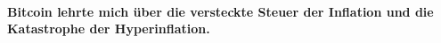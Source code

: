 \paragraph{Bitcoin lehrte mich über die versteckte Steuer der Inflation und die
Katastrophe der Hyperinflation.}

%
%
%
%
%
